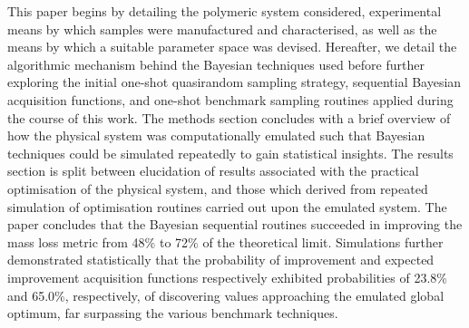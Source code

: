 This paper begins by detailing the polymeric system
 considered, experimental means by which samples were manufactured
 and characterised, as well as the means by which a suitable 
 parameter space was devised.
Hereafter, we detail the algorithmic mechanism behind the Bayesian 
 techniques used before further exploring the initial one-shot quasirandom
 sampling strategy, sequential Bayesian acquisition functions, and 
 one-shot benchmark sampling routines applied during the course of this
 work.
The methods section concludes with a brief overview of how the physical system
 was computationally emulated such that Bayesian techniques could be
 simulated repeatedly to gain statistical insights.
The results section is split between elucidation of results associated
 with the practical optimisation of the physical system, and those which
 derived from repeated simulation of optimisation routines carried 
 out upon the emulated system.
The paper concludes that the Bayesian sequential routines succeeded in
 improving the mass loss metric from 48\% to 72\% of the theoretical 
 limit.
Simulations further demonstrated statistically that the probability of
 improvement and expected improvement acquisition functions
 respectively exhibited probabilities of 23.8\% and 65.0\%, respectively, of
 discovering values approaching the emulated global optimum,
 far surpassing the various benchmark techniques.